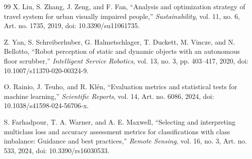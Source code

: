\documentclass[conference]{IEEEtran}
\begin{document}
\begin{thebibliography}{99}
X. Liu, S. Zhang, J. Zeng, and F. Fan,
``Analysis and optimization strategy of travel system for urban
visually impaired people,''
\emph{Sustainability}, vol. 11, no. 6,
Art. no. 1735, 2019,
doi: 10.3390/su11061735.

Z. Yan, S. Schreiberhuber, G. Halmetschlager,
T. Duckett, M. Vincze, and N. Bellotto,
``Robot perception of static and dynamic objects with an
autonomous floor scrubber,''
\emph{Intelligent Service Robotics},
vol. 13, no. 3, pp. 403--417, 2020,
doi: 10.1007/s11370-020-00324-9.

O. Rainio, J. Teuho, and R. Klén,
``Evaluation metrics and statistical tests for machine learning,''
\emph{Scientific Reports}, vol. 14,
Art. no. 6086, 2024,
doi: 10.1038/s41598-024-56706-x.

S. Farhadpour, T. A. Warner, and A. E. Maxwell,
``Selecting and interpreting multiclass loss and accuracy
assessment metrics for classifications with class imbalance:
Guidance and best practices,''
\emph{Remote Sensing}, vol. 16, no. 3,
Art. no. 533, 2024,
doi: 10.3390/rs16030533.

\end{thebibliography}
\end{document}
